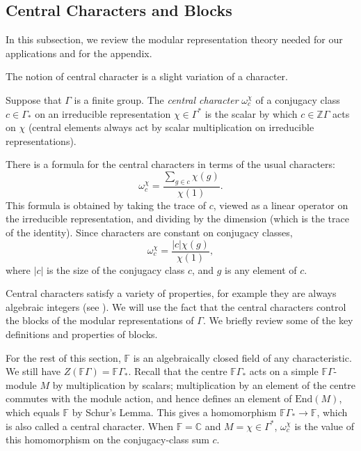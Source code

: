  

\subsection{Central Characters and Blocks} \label{mod_rep_thy_subsect}

In this subsection, we review the modular representation theory needed for our applications and for the appendix.

The notion of central character is a slight variation of a character.
\begin{definition}
Suppose that $\Gamma$ is a finite group. The \emph{central character} $\omega_c^\chi$ of a conjugacy class $c \in \Gamma_*$ on an irreducible representation $\chi \in \Gamma^*$ is the scalar by which $c \in \mathbb{Z}\Gamma$ acts on $\chi$ \textup{(}central elements always act by scalar multiplication on irreducible representations\textup{)}.
\end{definition}

There is a formula for the central characters in terms of the usual characters:
\[
\omega_c^\chi = \frac{\sum_{g \in c} \chi(g)}{\chi(1)}.
\]
This formula is obtained by taking the trace of $c$, viewed as a linear operator on the irreducible representation, and dividing by the dimension (which is the trace of the identity). Since characters are constant on conjugacy classes,
\[
\omega_c^\chi = \frac{|c|\chi(g)}{\chi(1)},
\]
where $|c|$ is the size of the conjugacy class $c$, and $g$ is any element of $c$.

Central characters satisfy a variety of properties, for example they are always algebraic integers (see \cite[Proposition 5.3.2]{EtingofEtAl}). We will use the fact that the central characters control the blocks of the modular representations of $\Gamma$. We briefly review some of the key definitions and properties of blocks.

For the rest of this section, $\mathbb{F}$ is an algebraically closed field of any characteristic. We still have $Z(\mathbb{F}\Gamma) = \mathbb{F}\Gamma_*$. Recall that the centre $\mathbb{F}\Gamma_*$ acts on a simple $\mathbb{F}\Gamma$-module $M$ by multiplication by scalars; multiplication by an element of the centre commutes with the module action, and hence defines an element of $\mathrm{End}(M)$, which equals $\mathbb{F}$ by Schur's Lemma. This gives a homomorphism $\mathbb{F}\Gamma_* \to \mathbb{F}$, which is also called a central character. When $\mathbb{F} = \mathbb{C}$ and $M = \chi \in \Gamma^*$, $\omega_c^\chi$ is the value of this homomorphism on the conjugacy-class sum $c$.


